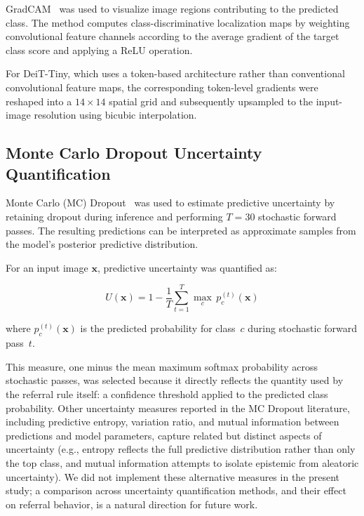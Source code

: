 \documentclass[11pt,a4paper]{article}
\begin{document}
GradCAM~\citep{Selvaraju2017} was used to visualize image regions
contributing to the predicted class. The method computes class-discriminative
localization maps by weighting convolutional feature channels according to the
average gradient of the target class score and applying a ReLU operation.

For DeiT-Tiny, which uses a token-based architecture rather than conventional
convolutional feature maps, the corresponding token-level gradients were
reshaped into a $14\times14$ spatial grid and subsequently upsampled to the
input-image resolution using bicubic interpolation.

\subsection{Monte Carlo Dropout Uncertainty Quantification}
\label{sec:mcdropout}

Monte Carlo (MC) Dropout~\citep{Gal2016} was used to estimate predictive
uncertainty by retaining dropout during inference and performing $T=30$
stochastic forward passes. The resulting predictions can be interpreted as
approximate samples from the model's posterior predictive distribution.

For an input image $\mathbf{x}$, predictive uncertainty was quantified as:

\begin{equation}
  U(\mathbf{x}) = 1 - \frac{1}{T}\sum_{t=1}^{T}\max_c\, p_c^{(t)}(\mathbf{x})
  \label{eq:uncertainty}
\end{equation}

where $p_c^{(t)}(\mathbf{x})$ is the predicted probability for class~$c$
during stochastic forward pass~$t$.

This measure, one minus the mean maximum softmax probability across
stochastic passes, was selected because it directly reflects the quantity
used by the referral rule itself: a confidence threshold applied to the
predicted class probability. Other uncertainty measures reported in the MC
Dropout literature, including predictive entropy, variation ratio, and
mutual information between predictions and model parameters, capture related
but distinct aspects of uncertainty (e.g., entropy reflects the full
predictive distribution rather than only the top class, and mutual
information attempts to isolate epistemic from aleatoric uncertainty). We
did not implement these alternative measures in the present study; a
comparison across uncertainty quantification methods, and their effect on
referral behavior, is a natural direction for future work.
\end{document}
